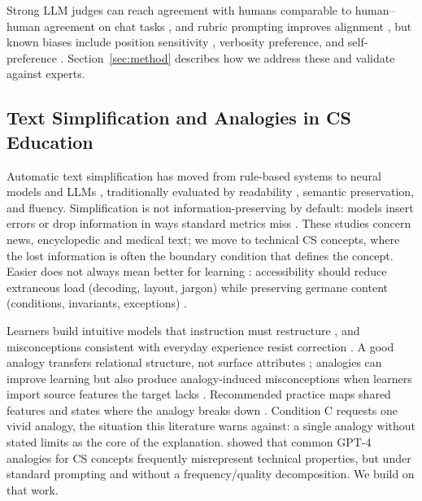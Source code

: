 \documentclass[journal,article,submit,pdftex,moreauthors]{Definitions/mdpi}
\begin{document}
Strong LLM judges can reach agreement with humans comparable to human--human agreement on chat tasks \cite{zheng2023judging}, and rubric prompting improves alignment \cite{liu2023geval}, but known biases include position sensitivity \cite{wang2023large}, verbosity preference, and self-preference \cite{panickssery2024llm}. Section~\ref{sec:method} describes how we address these and validate against experts.

\subsection{Text Simplification and Analogies in CS Education}

Automatic text simplification has moved from rule-based systems to neural models and LLMs \cite{stajner2021automatic}, traditionally evaluated by readability \cite{flesch1948new}, semantic preservation, and fluency. Simplification is not information-preserving by default: models insert errors or drop information in ways standard metrics miss \cite{devaraj2022evaluating, trienes2024infolossqa}. These studies concern news, encyclopedic and medical text; we move to technical CS concepts, where the lost information is often the boundary condition that defines the concept. Easier does not always mean better for learning \cite{mcnamara1996good, kalyuga2003expertise, bjork2011making}: accessibility should reduce extraneous load (decoding, layout, jargon) while preserving germane content (conditions, invariants, exceptions) \cite{sweller1998cognitive}.

Learners build intuitive models that instruction must restructure \cite{posner1982accommodation, vosniadou1992mental}, and misconceptions consistent with everyday experience resist correction \cite{chi1994things}. A good analogy transfers relational structure, not surface attributes \cite{gentner1983structure}; analogies can improve learning but also produce analogy-induced misconceptions when learners import source features the target lacks \cite{spiro1989multiple}. Recommended practice maps shared features and states where the analogy breaks down \cite{glynn1991explaining}. Condition C requests one vivid analogy, the situation this literature warns against: a single analogy without stated limits as the core of the explanation. \citet{stone2024analogies} showed that common GPT-4 analogies for CS concepts frequently misrepresent technical properties, but under standard prompting and without a frequency/quality decomposition. We build on that work.
\end{document}
